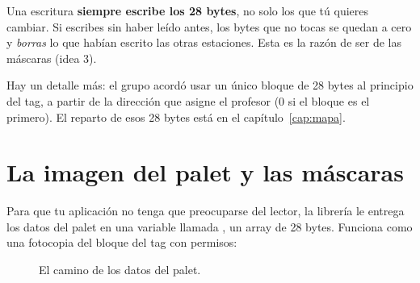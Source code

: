 \begin{ojo}
Una escritura \textbf{siempre escribe los 28 bytes}, no solo los que tú quieres cambiar. Si escribes sin haber leído antes, los bytes que no tocas se quedan a cero y \emph{borras} lo que habían escrito las otras estaciones. Esta es la razón de ser de las máscaras (idea 3).
\end{ojo}

Hay un detalle más: el grupo acordó usar un único bloque de 28 bytes al principio del tag, a partir de la dirección que asigne el profesor (0 si el bloque es el primero). El reparto de esos 28 bytes está en el capítulo~\ref{cap:mapa}.

\section{La imagen del palet y las máscaras}
Para que tu aplicación no tenga que preocuparse del lector, la librería le entrega los datos del palet en una variable llamada , un array de 28 bytes. Funciona como una fotocopia del bloque del tag con permisos:

\begin{figure}[ht]
\centering
{}
\caption{El camino de los datos del palet.}
\end{figure}

